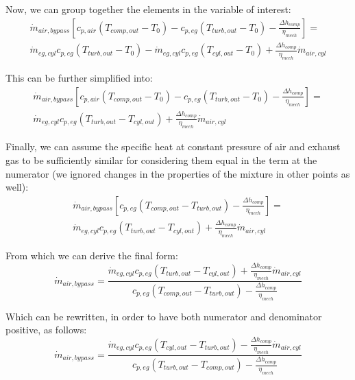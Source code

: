 \documentclass[]{article}
\begin{document}
Now, we can group together the elements in the variable of interest:
\begin{multline}
\dot{m}_{air,bypass} \left[ c_{p,air} (T_{comp,out} - T_0) - c_{p,eg} (T_{turb,out} - T_0) - \frac{\Delta h_{comp}}{\eta_{mech}} \right] = \\
\dot{m}_{eg,cyl} c_{p,eg} (T_{turb,out} - T_0) - \dot{m}_{eg,cyl} c_{p,eg}  (T_{cyl,out} - T_0) + \frac{\Delta h_{comp}}{\eta_{mech}}\dot{m}_{air,cyl}
\end{multline}

This can be further simplified into:
\begin{multline}
\dot{m}_{air,bypass} \left[ c_{p,air} (T_{comp,out} - T_0) - c_{p,eg} (T_{turb,out} - T_0) - \frac{\Delta h_{comp}}{\eta_{mech}} \right] = \\
\dot{m}_{eg,cyl} c_{p,eg} (T_{turb,out} - T_{cyl,out}) + \frac{\Delta h_{comp}}{\eta_{mech}}\dot{m}_{air,cyl}
\end{multline}

Finally, we can assume the specific heat at constant pressure of air and exhaust gas to be sufficiently similar for considering them equal in the term at the numerator (we ignored changes in the properties of the mixture in other points as well):
\begin{multline}
\dot{m}_{air,bypass} \left[ c_{p,eg} (T_{comp,out} - T_{turb,out}) - \frac{\Delta h_{comp}}{\eta_{mech}} \right] = \\
\dot{m}_{eg,cyl} c_{p,eg} (T_{turb,out} - T_{cyl,out}) + \frac{\Delta h_{comp}}{\eta_{mech}}\dot{m}_{air,cyl}
\end{multline}

From which we can derive the final form:
\begin{equation}
\dot{m}_{air,bypass} = \frac{\dot{m}_{eg,cyl} c_{p,eg} (T_{turb,out} - T_{cyl,out}) + \frac{\Delta h_{comp}}{\eta_{mech}}\dot{m}_{air,cyl}}{c_{p,eg} (T_{comp,out} - T_{turb,out}) - \frac{\Delta h_{comp}}{\eta_{mech}}} 
\end{equation}

Which can be rewritten, in order to have both numerator and denominator positive, as follows:
\begin{equation}
\dot{m}_{air,bypass} = \frac{\dot{m}_{eg,cyl} c_{p,eg} (T_{cyl,out} - T_{turb,out}) - \frac{\Delta h_{comp}}{\eta_{mech}}\dot{m}_{air,cyl}}{c_{p,eg} (T_{turb,out} - T_{comp,out}) - \frac{\Delta h_{comp}}{\eta_{mech}}} 
\end{equation}
\end{document}
